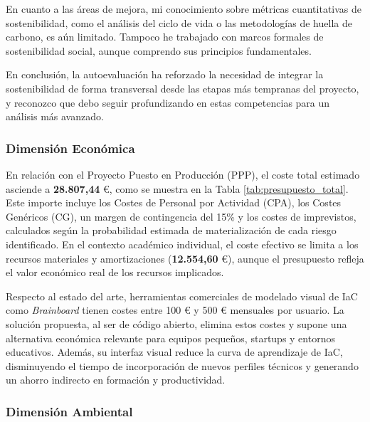 \documentclass{article}
\begin{document}
    \justify
    En cuanto a las áreas de mejora, mi conocimiento sobre métricas cuantitativas
    de sostenibilidad, como el análisis del ciclo de vida o las metodologías de
    huella de carbono, es aún limitado. Tampoco he trabajado con marcos formales
    de sostenibilidad social, aunque comprendo sus principios fundamentales.
    
    \justify
    En conclusión, la autoevaluación ha reforzado la necesidad de integrar la
    sostenibilidad de forma transversal desde las etapas más tempranas del
    proyecto, y reconozco que debo seguir profundizando en estas competencias
    para un análisis más avanzado.
    

    \subsubsection{Dimensión Económica}
    \normalsize
    \setlength{\parskip}{0.6em}
    \justify

    En relación con el Proyecto Puesto en Producción (PPP), el coste total estimado
    asciende a \textbf{28.807,44} \euro, como se muestra en la Tabla
    \ref{tab:presupuesto_total}. Este importe incluye los Costes de Personal por
    Actividad (CPA), los Costes Genéricos (CG), un margen de contingencia del 15\%
    y los costes de imprevistos, calculados según la probabilidad estimada de 
    materialización de cada riesgo identificado. En el contexto académico individual, 
    el coste efectivo se limita a los recursos materiales y amortizaciones
    (\textbf{12.554,60} \euro), aunque el presupuesto refleja el valor económico
    real de los recursos implicados.

    \justify
    Respecto al estado del arte, herramientas comerciales de modelado visual de IaC
    como \textit{Brainboard} tienen costes entre
    100 \euro{} y 500 \euro{} mensuales por usuario. La solución propuesta, al ser
    de código abierto, elimina estos costes y supone una alternativa económica
    relevante para equipos pequeños, startups y entornos educativos. Además, su
    interfaz visual reduce la curva de aprendizaje de IaC, disminuyendo el tiempo
    de incorporación de nuevos perfiles técnicos y generando un ahorro indirecto
    en formación y productividad.
    
    
    \subsubsection{Dimensión Ambiental}
    \normalsize
    \setlength{\parskip}{0.6em}
    \justify
\end{document}
